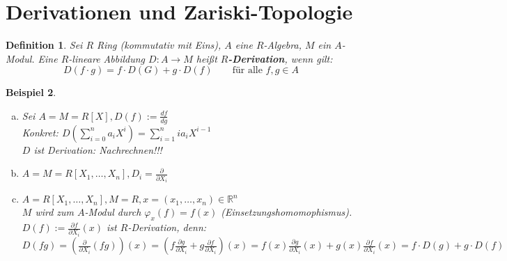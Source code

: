 \documentclass[a4paper,12pt]{report}
\theoremstyle{break}
\newtheorem{Def}{Definition}[section]
\newtheorem{Bsp}[Def]{Beispiel}
\theoremstyle{nonumberbreak}
\theoremstyle{nonumberplain}
\newcommand{\emp}[1]{\textbf{\emph{#1}}}
\newcommand{\begriffspez}[2]{{\index{#2}}\emp{#1}}
\newcommand{\Sum}{\sum\limits}
\newcommand{\R}{\mathbb{R}}
\begin{document}
\newpage


\section{Derivationen und Zariski-Topologie}

\begin{Def}\label{Def17.1}
Sei $R$ Ring (kommutativ mit Eins), $A$ eine $R$-Algebra, $M$ ein $A$-Modul. Eine $R$-lineare Abbildung $D:A\to M$ hei\ss t \begriffspez{$R$-Derivation}{Derivation}, wenn gilt:
	\[ D(f\cdot g)=f\cdot D(G) + g\cdot D(f) \qquad \text{f\"ur alle }f,g \in A\]
\end{Def}

\begin{Bsp}\label{Bsp17.2}\begin{enumerate}[a)]
\item\label{Bsp17.2a}
	Sei $A=M=R[X], D(f):=\frac{df}{dg}$\\
	Konkret: $D(\Sum_{i=0}^n a_iX^i)=\Sum_{i=1}^nia_iX^{i-1}$\\
	$D$ ist Derivation: Nachrechnen!!!
\item
	$A=M=R[X_1,\ldots ,X_n], D_i=\frac{\partial}{\partial X_i}$
\item\label{Bsp17.2c}
	$A=R[X_1,\ldots ,X_n], M=R, x=(x_1,\ldots ,x_n)\in \R^n$\\
	$M$ wird zum $A$-Modul durch $\varphi_x(f)=f(x)$ (Einsetzungshomomophismus).\\
	$D(f):=\frac{\partial f}{\partial X_i}(x)$ ist $R$-Derivation, \emph{denn:}\\
	$D(fg)=(\frac{\partial}{\partial X_i}(fg))(x)=(f\frac{\partial g}{\partial X_i}+g\frac{\partial f}{\partial X_i})(x) = f(x)\frac{\partial g}{\partial X_i}(x) + g(x)\frac{\partial f}{\partial X_i}(x) = f\cdot D(g) + g\cdot D(f)$
\end{enumerate}\end{Bsp}
\end{document}
